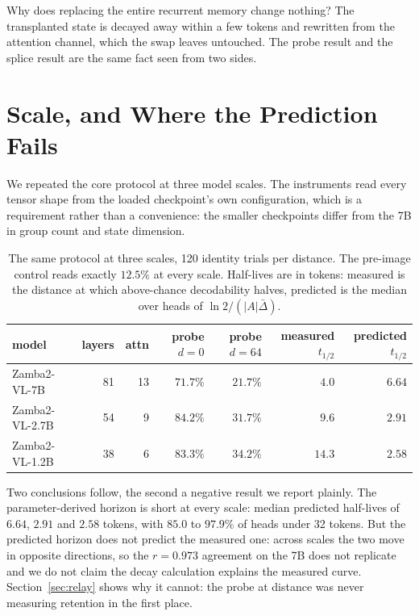 Why does replacing the entire recurrent memory change nothing? The transplanted
state is decayed away within a few tokens and rewritten from the attention
channel, which the swap leaves untouched. The probe result and the splice
result are the same fact seen from two sides.

\section{Scale, and Where the Prediction Fails}
\label{sec:scale}

We repeated the core protocol at three model scales. The instruments read
every tensor shape from the loaded checkpoint's own configuration, which is a
requirement rather than a convenience: the smaller checkpoints differ from the
7B in group count and state dimension.

\begin{table}[t]
\centering\small
\begin{tabular}{lrrrrrr}
\toprule
model & layers & attn & probe $d{=}0$ & probe $d{=}64$ & measured $t_{1/2}$ & predicted $t_{1/2}$ \\
\midrule
Zamba2-VL-7B   & 81 & 13 & $71.7\%$ & $21.7\%$ & $4.0$  & $6.64$ \\
Zamba2-VL-2.7B & 54 &  9 & $84.2\%$ & $31.7\%$ & $9.6$  & $2.91$ \\
Zamba2-VL-1.2B & 38 &  6 & $83.3\%$ & $34.2\%$ & $14.3$ & $2.58$ \\
\bottomrule
\end{tabular}
\caption{The same protocol at three scales, 120 identity trials per distance.
The pre-image control reads exactly $12.5\%$ at every scale. Half-lives are in
tokens: measured is the distance at which above-chance decodability halves,
predicted is the median over heads of $\ln 2/(|A|\bar{\Delta})$.}
\label{tab:scale}
\end{table}

Two conclusions follow, the second a negative result we report plainly. The
parameter-derived horizon is short at every scale: median predicted half-lives
of $6.64$, $2.91$ and $2.58$ tokens, with $85.0$ to $97.9\%$ of heads under 32
tokens. But the predicted horizon does not predict the measured one: across
scales the two move in opposite directions, so the $r = 0.973$ agreement on
the 7B does not replicate and we do not claim the decay calculation explains
the measured curve. Section~\ref{sec:relay} shows why it cannot: the probe at
distance was never measuring retention in the first place.

